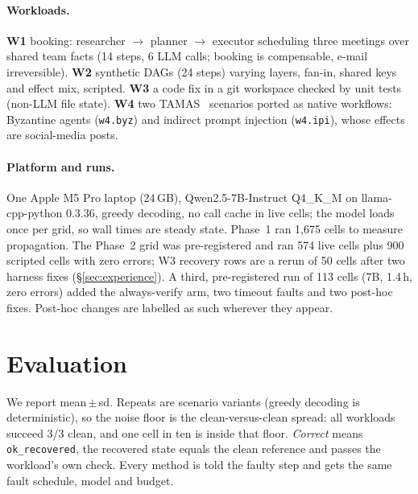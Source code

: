 \documentclass[10pt,twocolumn,letterpaper]{article}
\begin{document}
\paragraph{Workloads.}
\textbf{W1} booking: researcher $\to$ planner $\to$ executor scheduling three
meetings over shared team facts (14 steps, 6 LLM calls; booking is compensable,
e-mail irreversible).
\textbf{W2} synthetic DAGs (24 steps) varying layers, fan-in, shared keys and effect
mix, scripted. \textbf{W3} a code fix in a git workspace checked by unit tests
(non-LLM file state). \textbf{W4} two TAMAS~\cite{kavathekar2025tamas} scenarios
ported as native workflows: Byzantine agents (\texttt{w4.byz}) and indirect prompt
injection (\texttt{w4.ipi}), whose effects are social-media posts.

\paragraph{Platform and runs.} One Apple M5 Pro laptop (24\,GB), Qwen2.5-7B-Instruct
Q4\_K\_M on llama-cpp-python 0.3.36, greedy decoding, no call cache in live cells;
the model loads once per grid, so wall times are steady state. Phase~1 ran 1{,}675 cells to measure
propagation. The Phase~2 grid was pre-registered and ran 574 live cells plus 900
scripted cells with zero errors; W3 recovery rows are a rerun of 50 cells after two
harness fixes (\S\ref{sec:experience}). A third, pre-registered run of 113 cells
(7B, 1.4\,h, zero errors) added the always-verify arm, two timeout faults and two
post-hoc fixes. Post-hoc changes are labelled as such wherever they appear.

\section{Evaluation}
\label{sec:eval}

We report mean\,$\pm$\,sd. Repeats are scenario variants (greedy decoding is
deterministic), so the noise floor is the clean-versus-clean spread: all workloads
succeed 3/3 clean, and one cell in ten is inside that floor. \emph{Correct} means
\texttt{ok\_recovered}, the recovered state equals the clean reference and passes
the workload's own check. Every method is told the faulty step and gets the same
fault schedule, model and budget.
\end{document}
